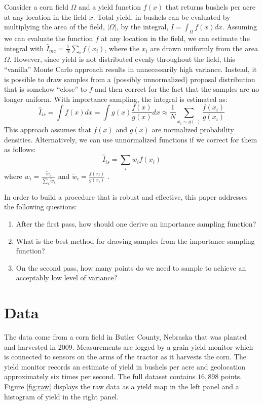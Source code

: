 \documentclass{article} %
\begin{document}
Consider a corn field $\Omega$ and a yield function $f(x)$ that returns bushels per acre at any location in the field $x$. Total yield, in bushels can be evaluated by multiplying the area of the field, $|\Omega|$, by the integral, $I = \int_{\Omega} f(x) dx$. Assuming we can evaluate the function $f$ at any location in the field, we can estimate the integral with $\hat{I}_{mc} = \frac{1}{N} \sum_i f(x_i)$, where the $x_i$ are drawn uniformly from the area $\Omega$. However, since yield is not distributed evenly throughout the field, this ``vanilla'' Monte Carlo approach results in unnecessarily high variance. Instead, it is possible to draw samples from a (possibly unnormalized) proposal distribution that is somehow ``close'' to $f$ and then correct for the fact that the samples are no longer uniform. With importance sampling, the integral is estimated as:
$$\hat{I}_{is} = \int f(x) dx = \int g(x) \frac{f(x)}{g(x)}dx \approx \frac{1}{N}\sum_{x_i \sim g(.)} \frac{f(x_i)}{g(x_i)}$$
This approach assumes that $f(x)$ and $g(x)$ are normalized probability densities. Alternatively, we can use unnormalized functions if we correct for them as follows:
$$\hat{I}_{is} = \sum_i w_i f(x_i)$$
where $w_i = \frac{\widetilde{w}_i}{\sum_i \widetilde{w}_i}$ and $\widetilde{w}_i = \frac{f(x_i)}{g(x_i)}$ \cite{murphy}.

In order to build a procedure that is robust and effective, this paper addresses the following questions:
\begin{enumerate}
\item After the first pass, how should one derive an importance sampling function?
\item What is the best method for drawing samples from the importance sampling function?
\item On the second pass, how many points do we need to sample to achieve an acceptably low level of variance?
\end{enumerate}

\section{Data}

The data come from a corn field in Butler County, Nebraska that was planted and harvested in 2009. Measurements are logged by a grain yield monitor which is connected to sensors on the arms of the tractor as it harvests the corn. The yield monitor records an estimate of yield in bushels per acre and geolocation approximately six times per second. The full dataset contains $16,898$ points. Figure \ref{fig:raw} displays the raw data as a yield map in the left panel and a histogram of yield in the right panel.
\end{document}

